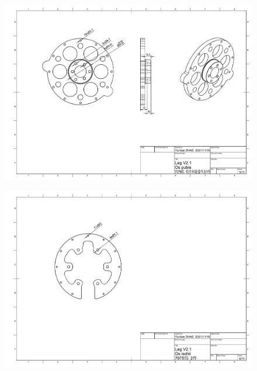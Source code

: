 \begin{figure}
  \centering
  \includegraphics[width=1.4\linewidth, angle=90]{figures/appendix/dwg3.pdf}
   \vspace{6pt}
\end{figure}

\begin{figure}
  \centering
  \includegraphics[width=1.4\linewidth, angle=90]{figures/appendix/dwg4.pdf}
   \vspace{6pt}
\end{figure}

